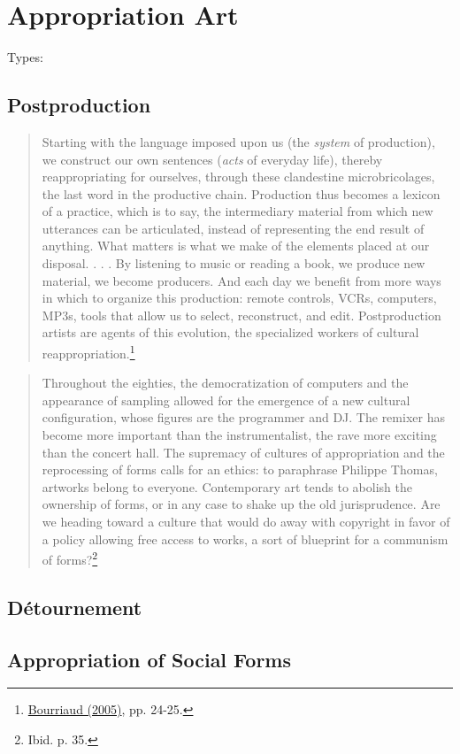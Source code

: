 \section{Appropriation Art}


Types:

\subsection {Postproduction}

\begin{quote}
Starting with the language imposed upon us (the \emph{system} of production), we construct our own sentences (\emph{acts} of everyday life), thereby reappropriating for ourselves, through these clandestine microbricolages, the last word in the productive chain. Production thus becomes a lexicon of a practice, which is to say, the intermediary material from which new utterances can be articulated, instead of representing the end result of anything. What matters is what we make of the elements placed at our disposal. . . . By listening to music or reading a book, we produce new material, we become producers. And each day we benefit from more ways in which to organize this production: remote controls, VCRs, computers, MP3s, tools that allow us to select, reconstruct, and edit. Postproduction artists are agents of this evolution, the specialized workers of cultural reappropriation.\footnote{\hyperlink{postproduction}{Bourriaud (2005)}, pp. 24-25.}
\end{quote}

\begin{quote}
Throughout the eighties, the democratization of computers and the appearance of sampling allowed for the emergence of a new cultural configuration, whose figures are the programmer and DJ. The remixer has become more important than the instrumentalist, the rave more exciting than the concert hall. The supremacy of cultures of appropriation and the reprocessing of forms calls for an ethics: to paraphrase Philippe Thomas, artworks belong to everyone. Contemporary art tends to abolish the ownership of forms, or in any case to shake up the old jurisprudence. Are we heading toward a culture that would do away with copyright in favor of a policy allowing free access to works, a sort of blueprint for a communism of forms?\footnote{Ibid. p. 35.}
\end{quote}

\subsection {D\'etournement}

\subsection {Appropriation of Social Forms}

\label{ch:approp}